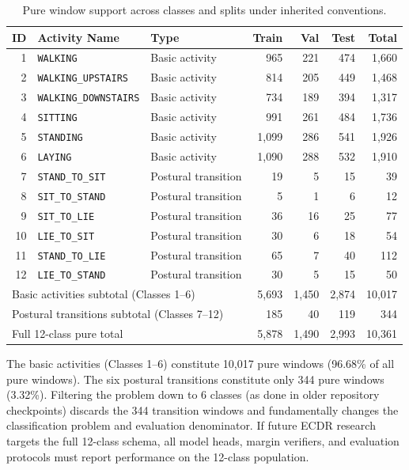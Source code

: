 \documentclass[11pt,a4paper]{article}
\newcommand{\code}[1]{{\small\ttfamily\nolinkurl{#1}}}
\theoremstyle{definition}
\begin{document}
\begin{table}[htbp]\centering\small
\begin{tabular}{rllrrrr}\toprule
ID & Activity Name & Type & Train & Val & Test & Total\\\midrule
1 & \code{WALKING} & Basic activity & 965 & 221 & 474 & 1,660\\
2 & \code{WALKING_UPSTAIRS} & Basic activity & 814 & 205 & 449 & 1,468\\
3 & \code{WALKING_DOWNSTAIRS} & Basic activity & 734 & 189 & 394 & 1,317\\
4 & \code{SITTING} & Basic activity & 991 & 261 & 484 & 1,736\\
5 & \code{STANDING} & Basic activity & 1,099 & 286 & 541 & 1,926\\
6 & \code{LAYING} & Basic activity & 1,090 & 288 & 532 & 1,910\\
7 & \code{STAND_TO_SIT} & Postural transition & 19 & 5 & 15 & 39\\
8 & \code{SIT_TO_STAND} & Postural transition & 5 & 1 & 6 & 12\\
9 & \code{SIT_TO_LIE} & Postural transition & 36 & 16 & 25 & 77\\
10 & \code{LIE_TO_SIT} & Postural transition & 30 & 6 & 18 & 54\\
11 & \code{STAND_TO_LIE} & Postural transition & 65 & 7 & 40 & 112\\
12 & \code{LIE_TO_STAND} & Postural transition & 30 & 5 & 15 & 50\\\midrule
\multicolumn{3}{l}{Basic activities subtotal (Classes 1--6)} & 5,693 & 1,450 & 2,874 & 10,017\\
\multicolumn{3}{l}{Postural transitions subtotal (Classes 7--12)} & 185 & 40 & 119 & 344\\\midrule
\multicolumn{3}{l}{Full 12-class pure total} & 5,878 & 1,490 & 2,993 & 10,361\\\bottomrule
\end{tabular}
\caption{Pure window support across classes and splits under inherited conventions.}\label{tab:pure_class_support}
\end{table}

The basic activities (Classes 1--6) constitute 10,017 pure windows (96.68\% of all pure windows). The six postural transitions constitute only 344 pure windows (3.32\%). Filtering the problem down to 6 classes (as done in older repository checkpoints) discards the 344 transition windows and fundamentally changes the classification problem and evaluation denominator. If future ECDR research targets the full 12-class schema, all model heads, margin verifiers, and evaluation protocols must report performance on the 12-class population.
\end{document}
